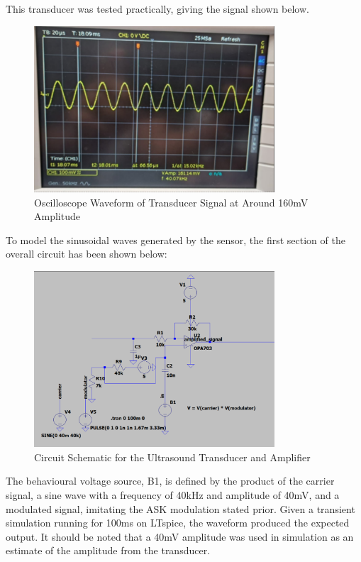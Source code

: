 This transducer was tested practically, giving the signal shown below.
\begin{figure}[h]
    \centering
    \includegraphics[width=0.8\textwidth]{subpages/images/ultra_oscilloscope_transducer.png}
    \caption{Oscilloscope Waveform of Transducer Signal at Around 160mV Amplitude}
    \label{fig:transducer_waveform}
\end{figure}
To model the sinusoidal waves generated by the sensor, the first section of the overall circuit has been shown below:
\begin{figure}[H]
    \centering
    \includegraphics[width=0.8\textwidth]{subpages/images/ultra_circuit_trans_amp.png}
    \caption{Circuit Schematic for the Ultrasound Transducer and Amplifier}
    \label{fig:transducer_amplifier_circuit}
\end{figure}
The behavioural voltage source, B1, is defined by the product of the carrier signal, a sine wave with a frequency of 40kHz and amplitude of 40mV, and a modulated signal, imitating the ASK modulation stated prior. Given a transient simulation running for 100ms on LTspice, the waveform produced the expected output. It should be noted that a 40mV amplitude was used in simulation as an estimate of the amplitude from the transducer.

